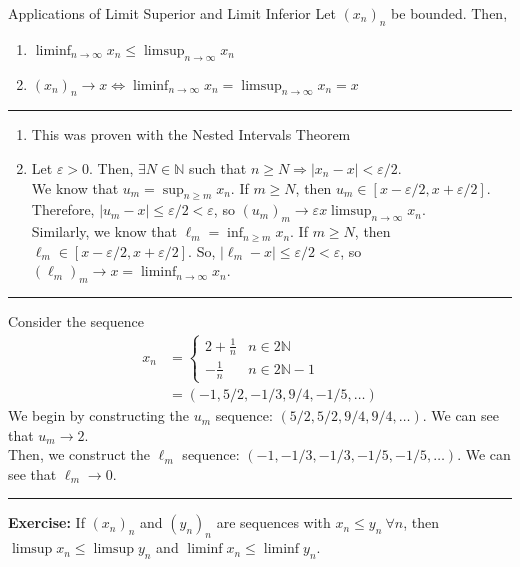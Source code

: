 \documentclass[8pt]{extarticle}
\newcommand{\N}{\mathbb{N}}
\begin{document}
  \begin{problem}{Applications of Limit Superior and Limit Inferior}
    Let $(x_n)_n$ be bounded. Then,
    \begin{enumerate}[(1)]
      \item $\displaystyle \liminf_{n\rightarrow\infty} x_n \leq \limsup_{n\rightarrow\infty} x_n$
      \item $\displaystyle (x_n)_n\rightarrow x \Leftrightarrow \liminf_{n\rightarrow\infty}x_n = \limsup_{n\rightarrow\infty}x_n = x$
    \end{enumerate}
    \vspace{4pt}
    \rule{\textwidth}{0.4pt}
    \vspace{4pt}
    \begin{enumerate}[(1)]
      \item This was proven with the Nested Intervals Theorem
      \item Let $\varepsilon > 0$. Then, $\exists N \in\N$ such that $n\geq N \Rightarrow |x_n - x| < \varepsilon/2$.\\

        We know that $u_m = \sup_{n\geq m}x_n$. If $m\geq N$, then $u_m \in [x-\varepsilon/2,x+\varepsilon/2]$. Therefore, $|u_m-x| \leq \varepsilon/2 < \varepsilon$, so $(u_m)_m \rightarrow \varepsilon x \limsup_{n\rightarrow\infty}x_n$.\\

        Similarly, we know that $\ell_m = \inf_{n\geq m}x_n$. If $m\geq N$, then $\ell_m \in [x-\varepsilon/2,x+\varepsilon/2]$. So, $|\ell_m - x| \leq \varepsilon/2 < \varepsilon$, so $(\ell_m)_m \rightarrow x = \liminf_{n\rightarrow\infty}x_n$.
    \end{enumerate}
    \vspace{4pt}
    \rule{\textwidth}{0.4pt}
    \vspace{4pt}
    Consider the sequence
    \begin{align*}
      x_n &= \begin{cases}
        2 + \frac{1}{n}&n\in2\N\\
        -\frac{1}{n}&n\in2\N-1
      \end{cases}\\
          &= (-1,5/2,-1/3,9/4,-1/5,\dots)
    \end{align*}
    We begin by constructing the $u_m$ sequence: $(5/2,5/2,9/4,9/4,\dots)$. We can see that $u_m \rightarrow 2$.\\

    Then, we construct the $\ell_m$ sequence: $(-1,-1/3,-1/3,-1/5,-1/5,\dots)$. We can see that $\ell_m\rightarrow 0$.\\
    \vspace{4pt}
    \rule{\textwidth}{0.4pt}
    \vspace{4pt}
    \textbf{Exercise:} If $(x_n)_n$ and $(y_n)_n$ are sequences with $x_n \leq y_n~\forall n$, then $\limsup x_n \leq \limsup y_n$ and $\liminf x_n \leq \liminf y_n$.
  \end{problem}
\end{document}
